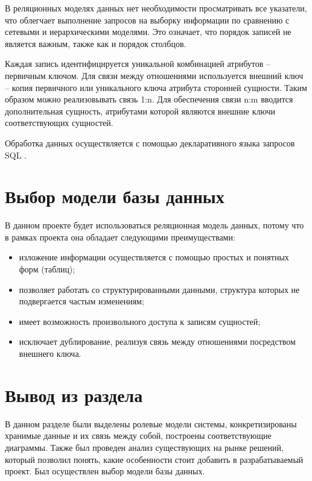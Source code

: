 В реляционных моделях данных нет необходимости просматривать все указатели, что облегчает выполнение запросов на выборку информации по сравнению с сетевыми и иерархическими моделями. Это означает, что порядок записей не является важным, также как и порядок столбцов.

Каждая запись идентифицируется уникальной комбинацией атрибутов -- первичным ключом. Для связи между отношениями используется внешний ключ -- копия первичного или уникального ключа атрибута сторонней сущности. Таким образом можно реализовывать связь 1:n. Для обеспечения связи n:m вводится дополнительная сущность, атрибутами которой являются внешние ключи соответствующих сущностей.

Обработка данных осуществляется с помощью декларативного языка запросов SQL \cite{sql}. 


\section{Выбор модели базы данных}

В данном проекте будет использоваться реляционная модель данных, потому что в рамках проекта она обладает следующими преимуществами:
\begin{itemize}
	\item изложение информации осуществляется с помощью простых и понятных форм (таблиц);
	\item позволяет работать со структурированными данными, структура которых не подвергается частым изменениям;
	\item имеет возможность произвольного доступа к записям сущностей;
	\item исключает дублирование, реализуя связь между отношениями посредством внешнего ключа.
\end{itemize}

\section{Вывод из раздела}

В данном разделе были выделены ролевые модели системы, конкретизированы хранимые данные и их связь между собой, построены соответствующие диаграммы. Также был проведен анализ существующих на рынке решений, который позволил понять, какие особенности стоит добавить в разрабатываемый проект. Был осуществлен выбор модели базы данных.